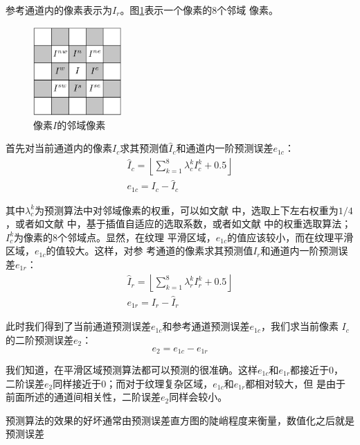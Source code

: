参考通道内的像素表示为$I_r$。图\ref{fig:pixel_neighbour2}表示一个像素的8个邻域
像素。
\begin{figure}
  \centering
  \includegraphics[width=0.3\textwidth]{figures/pixel_neighbourhood.eps}
  \caption{像素$I$的邻域像素}
  \label{fig:pixel_neighbour2}
\end{figure}
\par
首先对当前通道内的像素$I_c$求其预测值$\hat{I}_c$和通道内一阶预测误差$e_{1c}$：
\begin{eqnarray}
  & \displaystyle \hat{I}_c=
    \left\lfloor \sum_{k=1}^8\lambda_c^kI_c^k+0.5 \right\rfloor & \\
  & e_{1c}=I_c-\hat{I}_c &
  \label{eq:current_predict}
\end{eqnarray}
\par
其中$\lambda_c^k$为预测算法中对邻域像素的权重，可以如文献
\cite{sachnev2009reversible}中，选取上下左右权重为$1/4$，或者如文献
\cite{luo2010reversible}中，基于插值自适应的选取系数，或者如文献
\cite{li2013reversible}中的权重选取算法；$I_c^k$为像素的8个邻域点。显然，在纹理
平滑区域，$e_{1c}$的值应该较小，而在纹理平滑区域，$e_{1c}$的值较大。这样，对参
考通道的像素求其预测值$I_r$和通道内一阶预测误差$e_{1r}$：
\begin{eqnarray}
  & \displaystyle \hat{I}_r=
    \left\lfloor \sum_{k=1}^8\lambda_r^kI_r^k+0.5 \right\rfloor & \\
  & e_{1r}=I_r-\hat{I}_r &
  \label{eq:reference_predict}
\end{eqnarray}
\par
此时我们得到了当前通道预测误差$e_{1c}$和参考通道预测误差$e_{1c}$，我们求当前像素
$I_c$的二阶预测误差$e_2$：
\begin{equation}
  e_2=e_{1c}-e_{1r}
  \label{eq:second_predict}
\end{equation}
\par
我们知道，在平滑区域预测算法都可以预测的很准确。这样$e_{1c}$和$e_{1r}$都接近于0，
二阶误差$e_2$同样接近于0；而对于纹理复杂区域，$e_{1c}$和$e_{1r}$都相对较大，但
是由于前面所述的通道间相关性，二阶误差$e_2$同样会较小。
\par
预测算法的效果的好坏通常由预测误差直方图的陡峭程度来衡量，数值化之后就是预测误差
